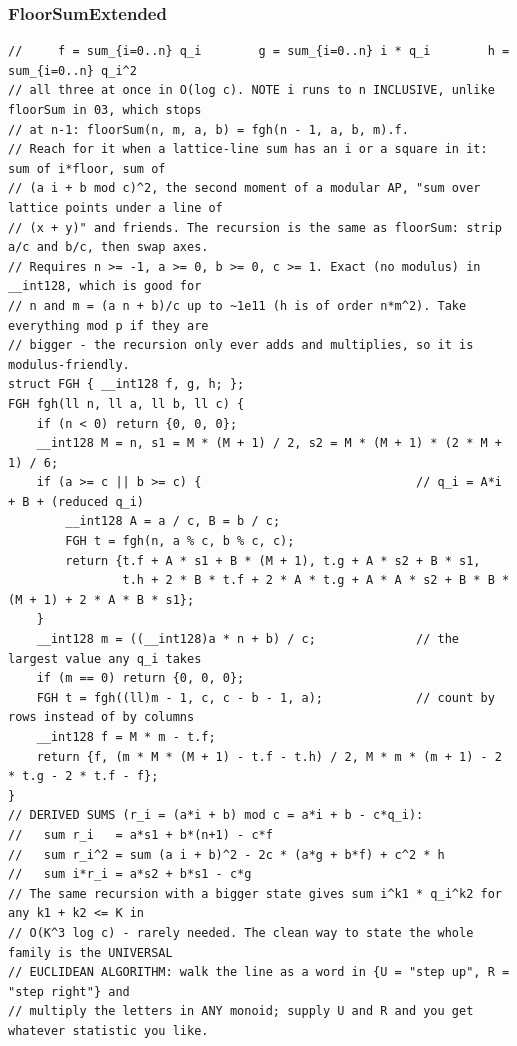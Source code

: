 \documentclass[9pt,a4paper,twocolumn]{extarticle}
\begin{document}
\filbreak
\subsubsection{FloorSumExtended}
\nopagebreak
\begin{lstlisting}
//     f = sum_{i=0..n} q_i        g = sum_{i=0..n} i * q_i        h = sum_{i=0..n} q_i^2
// all three at once in O(log c). NOTE i runs to n INCLUSIVE, unlike floorSum in 03, which stops
// at n-1: floorSum(n, m, a, b) = fgh(n - 1, a, b, m).f.
// Reach for it when a lattice-line sum has an i or a square in it: sum of i*floor, sum of
// (a i + b mod c)^2, the second moment of a modular AP, "sum over lattice points under a line of
// (x + y)" and friends. The recursion is the same as floorSum: strip a/c and b/c, then swap axes.
// Requires n >= -1, a >= 0, b >= 0, c >= 1. Exact (no modulus) in __int128, which is good for
// n and m = (a n + b)/c up to ~1e11 (h is of order n*m^2). Take everything mod p if they are
// bigger - the recursion only ever adds and multiplies, so it is modulus-friendly.
struct FGH { __int128 f, g, h; };
FGH fgh(ll n, ll a, ll b, ll c) {
    if (n < 0) return {0, 0, 0};
    __int128 M = n, s1 = M * (M + 1) / 2, s2 = M * (M + 1) * (2 * M + 1) / 6;
    if (a >= c || b >= c) {                              // q_i = A*i + B + (reduced q_i)
        __int128 A = a / c, B = b / c;
        FGH t = fgh(n, a % c, b % c, c);
        return {t.f + A * s1 + B * (M + 1), t.g + A * s2 + B * s1,
                t.h + 2 * B * t.f + 2 * A * t.g + A * A * s2 + B * B * (M + 1) + 2 * A * B * s1};
    }
    __int128 m = ((__int128)a * n + b) / c;              // the largest value any q_i takes
    if (m == 0) return {0, 0, 0};
    FGH t = fgh((ll)m - 1, c, c - b - 1, a);             // count by rows instead of by columns
    __int128 f = M * m - t.f;
    return {f, (m * M * (M + 1) - t.f - t.h) / 2, M * m * (m + 1) - 2 * t.g - 2 * t.f - f};
}
// DERIVED SUMS (r_i = (a*i + b) mod c = a*i + b - c*q_i):
//   sum r_i   = a*s1 + b*(n+1) - c*f
//   sum r_i^2 = sum (a i + b)^2 - 2c * (a*g + b*f) + c^2 * h
//   sum i*r_i = a*s2 + b*s1 - c*g
// The same recursion with a bigger state gives sum i^k1 * q_i^k2 for any k1 + k2 <= K in
// O(K^3 log c) - rarely needed. The clean way to state the whole family is the UNIVERSAL
// EUCLIDEAN ALGORITHM: walk the line as a word in {U = "step up", R = "step right"} and
// multiply the letters in ANY monoid; supply U and R and you get whatever statistic you like.
\end{lstlisting}
\end{document}
